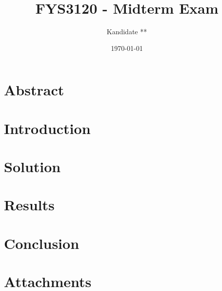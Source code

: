 \documentclass[norsk,a4paper,12pt]{article}
\title{FYS3120 - Midterm Exam}
\author{Kandidate **}
\date{\today}
\begin{document}
\maketitle



\newpage


\section*{Abstract}

\section*{Introduction}

\section*{Solution}

\section*{Results}

\section*{Conclusion}




 
\newpage

\section*{Attachments}


%

\end{document}
